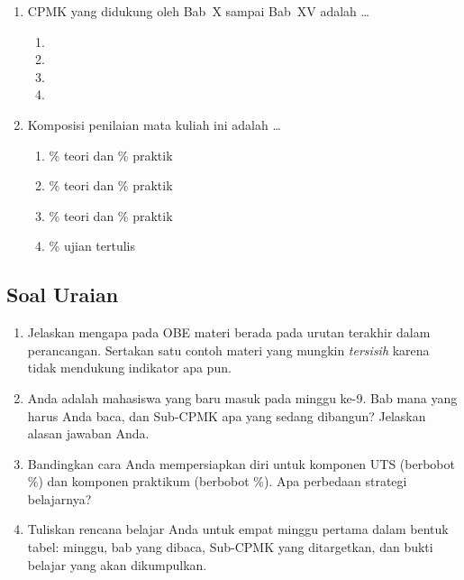 \begin{enumerate}
    \item CPMK yang didukung oleh Bab~X sampai Bab~XV adalah \dots
          \begin{enumerate}
              \item {} \item {}
              \item {} \item {}
          \end{enumerate}

    \item Komposisi penilaian mata kuliah ini adalah \dots
          \begin{enumerate}
              \item {}\% teori dan \% praktik
              \item {}\% teori dan \% praktik
              \item {}\% teori dan \% praktik
              \item {}\% ujian tertulis
          \end{enumerate}
\end{enumerate}

\subsection{Soal Uraian}

\begin{enumerate}
    \item Jelaskan mengapa pada OBE materi berada pada urutan terakhir
          dalam perancangan. Sertakan satu contoh materi yang mungkin
          \emph{tersisih} karena tidak mendukung indikator apa pun.

    \item Anda adalah mahasiswa yang baru masuk pada minggu ke-9.
          Bab mana yang harus Anda baca, dan Sub-CPMK apa yang sedang
          dibangun? Jelaskan alasan jawaban Anda.

    \item Bandingkan cara Anda mempersiapkan diri untuk komponen
          UTS (berbobot \%) dan komponen praktikum (berbobot
          \%). Apa perbedaan strategi belajarnya?

    \item Tuliskan rencana belajar Anda untuk empat minggu pertama
          dalam bentuk tabel: minggu, bab yang dibaca, Sub-CPMK yang
          ditargetkan, dan bukti belajar yang akan dikumpulkan.
\end{enumerate}

